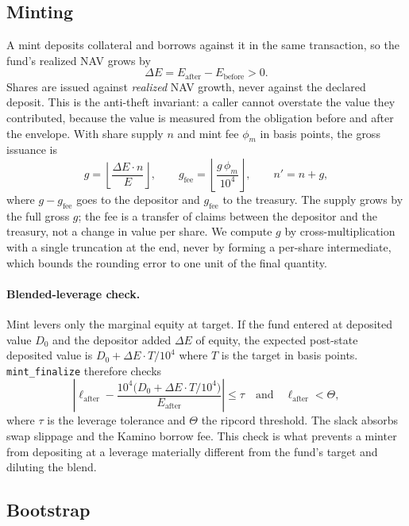 \documentclass[11pt]{article}
\theoremstyle{remark}
\newcommand{\fl}[1]{\left\lfloor #1 \right\rfloor}
\newcommand{\BPS}{10^{4}}
\newcommand{\NAV}{E}
\newcommand{\Lev}{\ell}
\begin{document}
\subsection{Minting}

A mint deposits collateral and borrows against it in the same transaction, so the fund's realized NAV grows by
\[
\Delta\NAV = \NAV_{\mathrm{after}} - \NAV_{\mathrm{before}} > 0.
\]
Shares are issued against \emph{realized} NAV growth, never against the declared deposit. This is the anti-theft invariant: a caller cannot overstate the value they contributed, because the value is measured from the obligation before and after the envelope. With share supply $n$ and mint fee $\phi_m$ in basis points, the gross issuance is
\begin{equation}
g = \fl{\frac{\Delta\NAV \cdot n}{\NAV}},
\qquad
g_{\mathrm{fee}} = \fl{\frac{g\,\phi_m}{\BPS}},
\qquad
n' = n + g,
\label{eq:mint}
\end{equation}
where $g - g_{\mathrm{fee}}$ goes to the depositor and $g_{\mathrm{fee}}$ to the treasury. The supply grows by the full gross $g$; the fee is a transfer of claims between the depositor and the treasury, not a change in value per share. We compute $g$ by cross-multiplication with a single truncation at the end, never by forming a per-share intermediate, which bounds the rounding error to one unit of the final quantity.

\paragraph{Blended-leverage check.}
Mint levers only the marginal equity at target. If the fund entered at deposited value $D_0$ and the depositor added $\Delta\NAV$ of equity, the expected post-state deposited value is $D_0 + \Delta\NAV \cdot T/\BPS$ where $T$ is the target in basis points. \texttt{mint\_finalize} therefore checks
\begin{equation}
\left| \Lev_{\mathrm{after}} - \frac{\BPS\bigl(D_0 + \Delta\NAV \cdot T/\BPS\bigr)}{\NAV_{\mathrm{after}}} \right| \le \tau
\quad\text{and}\quad
\Lev_{\mathrm{after}} < \Theta,
\label{eq:blended}
\end{equation}
where $\tau$ is the leverage tolerance and $\Theta$ the ripcord threshold. The slack absorbs swap slippage and the Kamino borrow fee. This check is what prevents a minter from depositing at a leverage materially different from the fund's target and diluting the blend.

\subsection{Bootstrap}
\end{document}
